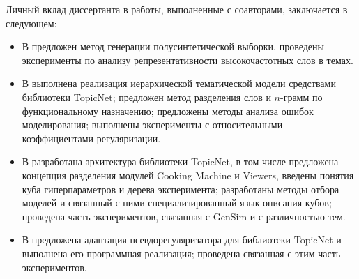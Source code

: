 {\contribution} Личный вклад диссертанта в работы, выполненные с
соавторами, заключается в следующем:
\begin{itemize}
    \item В \cite{intracoh} предложен метод генерации полусинтетической выборки, проведены эксперименты по анализу репрезентативности высокочастотных слов в темах.
    \item В \cite{popov_hier} выполнена реализация иерархической тематической модели средствами библиотеки TopicNet; предложен метод разделения слов и $n$-грамм по функциональному назначению; предложены методы анализа ошибок моделирования; выполнены эксперименты с относительными коэффициентами регуляризации.
    \item В \cite{bulatov2020topicnet} разработана архитектура библиотеки TopicNet, в том числе предложена концепция разделения модулей Cooking Machine и Viewers, введены понятия куба гиперпараметров и дерева эксперимента; разработаны методы отбора моделей и связанный с ними специализированный язык описания кубов; проведена часть экспериментов, связанная с GenSim и с различностью тем.
    \item В \cite{thetaless} предложена адаптация псевдорегуляризатора для библиотеки TopicNet и выполнена его программная реализация; проведена связанная с этим часть экспериментов.
\end{itemize}


